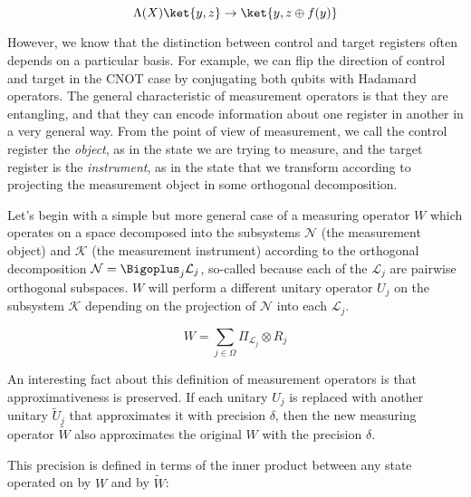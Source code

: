 \documentclass{article}
\begin{document}
\begin{equation}
\Lambda(X)\ket{y,z} \rightarrow \ket{y, z \oplus f(y)}
\end{equation}

However, we know that the distinction between control and target registers
often depends on a particular basis. For example, we can flip the direction
of control and target in the CNOT case by conjugating both qubits with
Hadamard operators. The general characteristic of measurement operators
is that they are entangling, and that they can encode information about
one register in another in a very general way.
From the point of view of measurement, we call the control register the
\emph{object}, as in the state we are trying to measure, and the target register
is the \emph{instrument}, as in the state that we transform according to
projecting the measurement object in some orthogonal decomposition.

Let's begin with a simple but more general case of a measuring operator
$W$ which operates on a space decomposed into the subsystems $\mathcal{N}$
(the measurement object) and $\mathcal{K}$ (the measurement instrument)
according to the orthogonal decomposition
$\mathcal{N} = \Bigoplus_j \mathcal{L}_j$, so-called because
each of the $\mathcal{L}_j$ are pairwise orthogonal subspaces.
$W$ will perform a different unitary
operator $U_j$ on the subsystem $\mathcal{K}$
depending on the projection of $\mathcal{N}$ into each $\mathcal{L}_j$.

\begin{equation}
W = \sum_{j \in \Omega} \Pi_{\mathcal{L}_j} \otimes R_j
\end{equation}

An interesting fact about this definition of measurement operators is
that approximativeness is preserved. If each unitary $U_j$ is replaced with
another unitary $\tilde{U}_j$ that approximates it with precision $\delta$,
then the new measuring operator $\tilde{W}$ also approximates the original
$W$ with the precision $\delta$.

This precision is defined in terms of the inner product between any state operated
on by $W$ and by $\tilde{W}$:

\begin{equation}

\end{equation}
\end{document}
